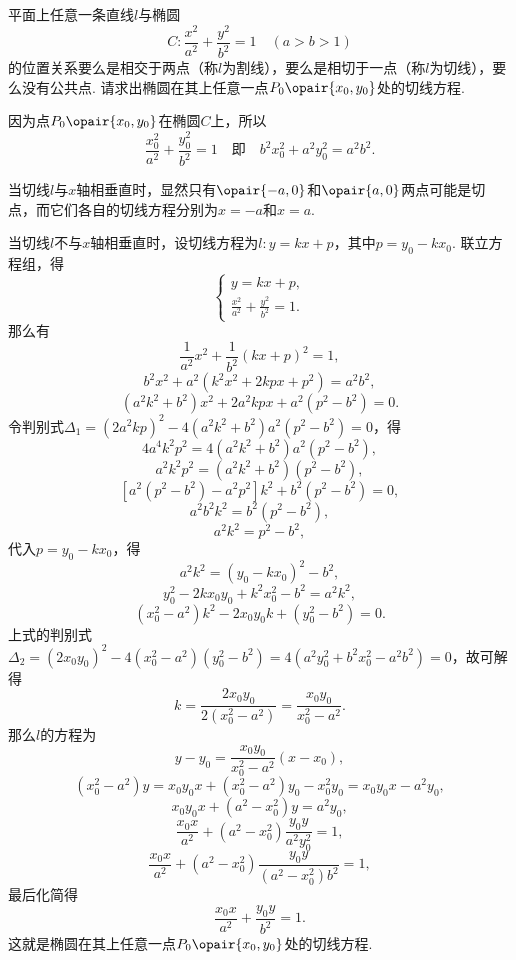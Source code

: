 \begin{example}\label{example:解析几何.椭圆的切线}
平面上任意一条直线\(l\)与椭圆\[
C: \frac{x^2}{a^2} + \frac{y^2}{b^2} = 1 \quad(a>b>1)
\]的位置关系要么是相交于两点（称\(l\)为割线），要么是相切于一点（称\(l\)为切线），要么没有公共点.
请求出椭圆在其上任意一点\(P_0\opair{x_0,y_0}\)处的切线方程.
\begin{solution}
因为点\(P_0\opair{x_0,y_0}\)在椭圆\(C\)上，所以\[
\frac{x_0^2}{a^2} + \frac{y_0^2}{b^2} = 1
\quad\text{即}\quad
b^2 x_0^2 + a^2 y_0^2 = a^2 b^2.
\]

当切线\(l\)与\(x\)轴相垂直时，显然只有\(\opair{-a,0}\)和\(\opair{a,0}\)两点可能是切点，而它们各自的切线方程分别为\(x=-a\)和\(x=a\).

当切线\(l\)不与\(x\)轴相垂直时，设切线方程为\(l: y = kx + p\)，其中\(p = y_0 - k x_0\).
联立方程组，得\[
\begin{cases}
y = kx + p, \\
\frac{x^2}{a^2} + \frac{y^2}{b^2} = 1.
\end{cases}
\]那么有\[
\frac{1}{a^2} x^2 + \frac{1}{b^2} (kx+p)^2 = 1,
\]\[
b^2 x^2 + a^2 (k^2 x^2 + 2kpx + p^2) = a^2 b^2,
\]\[
(a^2 k^2 + b^2) x^2 + 2 a^2 k p x + a^2 (p^2 - b^2) = 0.
\]令判别式\(\Delta_1 = (2 a^2 k p)^2 - 4 (a^2 k^2 + b^2) a^2 (p^2 - b^2) = 0\)，得\[
4 a^4 k^2 p^2 = 4 (a^2 k^2 + b^2) a^2 (p^2 - b^2),
\]\[
a^2 k^2 p^2 = (a^2 k^2 + b^2)(p^2 - b^2),
\]\[
[a^2 (p^2 - b^2) - a^2 p^2] k^2 + b^2 (p^2 - b^2) = 0,
\]\[
a^2 b^2 k^2 = b^2 (p^2 - b^2),
\]\[
a^2 k^2 = p^2 - b^2,
\]
代入\(p = y_0 - k x_0\)，得\[
a^2 k^2 = (y_0 - k x_0)^2 - b^2,
\]\[
y_0^2 - 2k x_0 y_0 + k^2 x_0^2 - b^2 = a^2 k^2,
\]\[
(x_0^2 - a^2) k^2 - 2 x_0 y_0 k + (y_0^2 - b^2) = 0.
\]上式的判别式\(\Delta_2 = (2 x_0 y_0)^2 - 4(x_0^2 - a^2)(y_0^2 - b^2)
= 4(a^2 y_0^2 + b^2 x_0^2 - a^2 b^2) = 0\)，故可解得\[
k = \frac{2 x_0 y_0}{2 (x_0^2 - a^2)}
= \frac{x_0 y_0}{x_0^2 - a^2}.
\]那么\(l\)的方程为\[
y - y_0 = \frac{x_0 y_0}{x_0^2 - a^2} (x - x_0),
\]\[
(x_0^2 - a^2) y = x_0 y_0 x + (x_0^2 - a^2) y_0 - x_0^2 y_0
= x_0 y_0 x - a^2 y_0,
\]\[
x_0 y_0 x + (a^2 - x_0^2) y = a^2 y_0,
\]\[
\frac{x_0 x}{a^2} + (a^2 - x_0^2) \frac{y_0 y}{a^2 y_0^2} = 1,
\]\[
\frac{x_0 x}{a^2} + (a^2 - x_0^2) \frac{y_0 y}{(a^2 - x_0^2) b^2} = 1,
\]最后化简得\begin{equation}\label{equation:解析几何.椭圆的切线}
\frac{x_0 x}{a^2} + \frac{y_0 y}{b^2} = 1.
\end{equation}
这就是椭圆在其上任意一点\(P_0\opair{x_0,y_0}\)处的切线方程.
\end{solution}
\end{example}

